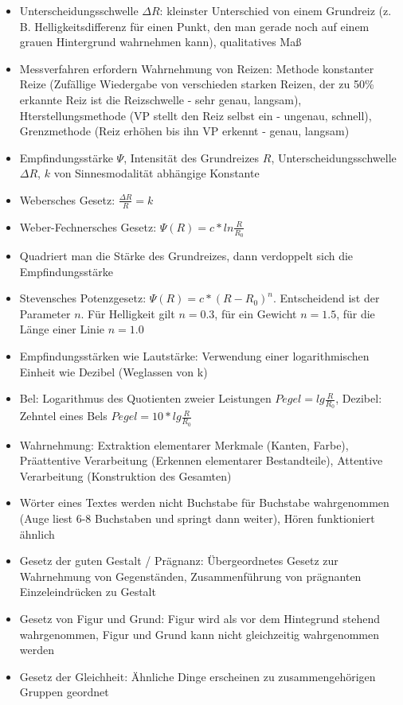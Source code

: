 \documentclass[12pt,landscape]{article}
\begin{document}
\begin{multicols}{3}
\begin{itemize}
\item Unterscheidungsschwelle $\Delta R$: kleinster Unterschied von einem Grundreiz (z. B. Helligkeitsdifferenz für einen Punkt, den man gerade noch auf einem grauen Hintergrund wahrnehmen kann), qualitatives Maß 
\item Messverfahren erfordern Wahrnehmung von Reizen: Methode konstanter Reize (Zufällige Wiedergabe von verschieden starken Reizen, der zu 50\% erkannte Reiz ist die Reizschwelle - sehr genau, langsam), Hterstellungsmethode (VP stellt den Reiz selbst ein - ungenau, schnell), Grenzmethode (Reiz erhöhen bis ihn VP erkennt - genau, langsam)
\item Empfindungsstärke $\Psi$, Intensität des Grundreizes $R$, Unterscheidungsschwelle $\Delta R$, $k$ von Sinnesmodalität abhängige Konstante
\item Webersches Gesetz: $\frac{\Delta R}{R} = k$
\item Weber-Fechnersches Gesetz: $\Psi(R) = c * ln \frac{R}{R_0}$
\item Quadriert man die Stärke des Grundreizes, dann verdoppelt sich die Empfindungsstärke
\item Stevensches Potenzgesetz: $\Psi(R) = c * (R - R_0)^n$. Entscheidend ist der Parameter $n$. Für Helligkeit gilt $n = 0.3$, für ein Gewicht $n = 1.5$, für die Länge einer Linie $n = 1.0$
\item Empfindungsstärken wie Lautstärke: Verwendung einer logarithmischen Einheit wie Dezibel (Weglassen von k)
\item Bel: Logarithmus des Quotienten zweier Leistungen $Pegel = lg \frac{R}{R_0}$, Dezibel: Zehntel eines Bels $Pegel = 10 * lg \frac{R}{R_0}$
\item Wahrnehmung: Extraktion elementarer Merkmale (Kanten, Farbe), Präattentive Verarbeitung (Erkennen elementarer Bestandteile), Attentive Verarbeitung (Konstruktion des Gesamten)
\item Wörter eines Textes werden nicht Buchstabe für Buchstabe wahrgenommen (Auge liest 6-8 Buchstaben und springt dann weiter), Hören funktioniert ähnlich
\item Gesetz der guten Gestalt / Prägnanz: Übergeordnetes Gesetz zur Wahrnehmung von Gegenständen, Zusammenführung von prägnanten Einzeleindrücken zu Gestalt
\item Gesetz von Figur und Grund: Figur wird als vor dem Hintegrund stehend wahrgenommen, Figur und Grund kann nicht gleichzeitig wahrgenommen werden
\item Gesetz der Gleichheit: Ähnliche Dinge erscheinen zu zusammengehörigen Gruppen geordnet

\end{itemize}
\end{multicols}
\end{document}
